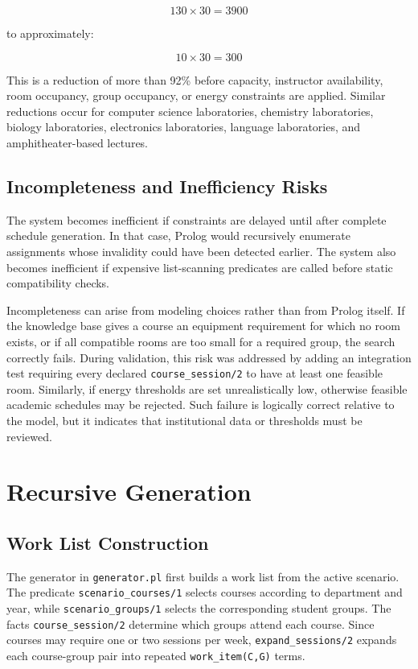 \documentclass[12pt,a4paper]{article}
\newcommand{\predicate}[1]{\texttt{#1}}
\newcommand{\term}[1]{\texttt{#1}}
\begin{document}
\[
    130 \times 30 = 3900
\]

to approximately:

\[
    10 \times 30 = 300
\]

This is a reduction of more than 92\% before capacity, instructor availability, room occupancy, group occupancy, or energy constraints are applied. Similar reductions occur for computer science laboratories, chemistry laboratories, biology laboratories, electronics laboratories, language laboratories, and amphitheater-based lectures.

\subsection{Incompleteness and Inefficiency Risks}

The system becomes inefficient if constraints are delayed until after complete schedule generation. In that case, Prolog would recursively enumerate assignments whose invalidity could have been detected earlier. The system also becomes inefficient if expensive list-scanning predicates are called before static compatibility checks.

Incompleteness can arise from modeling choices rather than from Prolog itself. If the knowledge base gives a course an equipment requirement for which no room exists, or if all compatible rooms are too small for a required group, the search correctly fails. During validation, this risk was addressed by adding an integration test requiring every declared \predicate{course\_session/2} to have at least one feasible room. Similarly, if energy thresholds are set unrealistically low, otherwise feasible academic schedules may be rejected. Such failure is logically correct relative to the model, but it indicates that institutional data or thresholds must be reviewed.

\section{Recursive Generation}

\subsection{Work List Construction}

The generator in \predicate{generator.pl} first builds a work list from the active scenario. The predicate \predicate{scenario\_courses/1} selects courses according to department and year, while \predicate{scenario\_groups/1} selects the corresponding student groups. The facts \predicate{course\_session/2} determine which groups attend each course. Since courses may require one or two sessions per week, \predicate{expand\_sessions/2} expands each course-group pair into repeated \term{work\_item(C,G)} terms.
\end{document}
